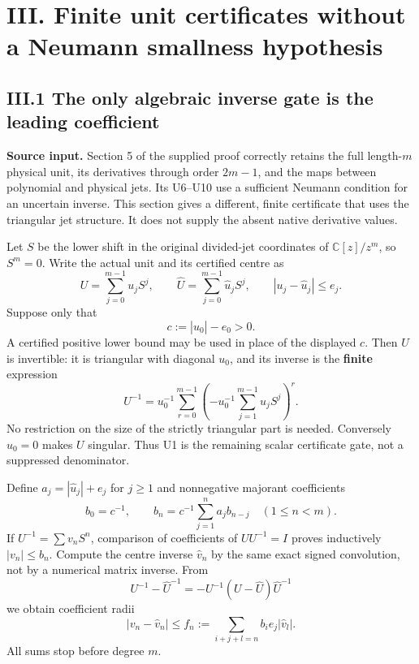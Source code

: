 \documentclass[11pt]{article}
\begin{document}
\section{III. Finite unit certificates without a Neumann smallness hypothesis}\label{iii.-finite-unit-certificates-without-a-neumann-smallness-hypothesis}

\subsection{III.1 The only algebraic inverse gate is the leading coefficient}\label{iii.1-the-only-algebraic-inverse-gate-is-the-leading-coefficient}

\textbf{Source input.} Section 5 of the supplied proof correctly retains the full length-\(m\) physical unit, its derivatives through order \(2m-1\), and the maps between polynomial and physical jets. Its U6--U10 use a sufficient Neumann condition for an uncertain inverse. This section gives a different, finite certificate that uses the triangular jet structure. It does not supply the absent native derivative values.

Let \(S\) be the lower shift in the original divided-jet coordinates of \(\mathbb C[z]/z^m\), so \(S^m=0\). Write the actual unit and its certified centre as \[
 U=\sum_{j=0}^{m-1}u_jS^j,\qquad
 \widehat U=\sum_{j=0}^{m-1}\widehat u_jS^j,\qquad
 |u_j-\widehat u_j|\le e_j.
\] Suppose only that \[
 c:=|\widehat u_0|-e_0>0.
 \tag{U1}
\] A certified positive lower bound may be used in place of the displayed \(c\). Then \(U\) is invertible: it is triangular with diagonal \(u_0\), and its inverse is the \textbf{finite} expression \[
 U^{-1}=u_0^{-1}\sum_{r=0}^{m-1}
 \left(-u_0^{-1}\sum_{j=1}^{m-1}u_jS^j\right)^r.
 \tag{U2}
\] No restriction on the size of the strictly triangular part is needed. Conversely \(u_0=0\) makes \(U\) singular. Thus U1 is the remaining scalar certificate gate, not a suppressed denominator.

Define \(a_j=|\widehat u_j|+e_j\) for \(j\ge1\) and nonnegative majorant coefficients \[
 b_0=c^{-1},\qquad
 b_n=c^{-1}\sum_{j=1}^{n}a_jb_{n-j}\quad(1\le n<m).
 \tag{U3}
\] If \(U^{-1}=\sum v_nS^n\), comparison of coefficients of \(UU^{-1}=I\) proves inductively \(|v_n|\le b_n\). Compute the centre inverse \(\widehat v_n\) by the same exact signed convolution, not by a numerical matrix inverse. From \[
 U^{-1}-\widehat U^{-1}=-U^{-1}(U-\widehat U)\widehat U^{-1}
\] we obtain coefficient radii \[
 \boxed{|v_n-\widehat v_n|\le f_n:=\sum_{i+j+l=n}b_i e_j|\widehat v_l|.}
 \tag{U4}
\] All sums stop before degree \(m\).
\end{document}
